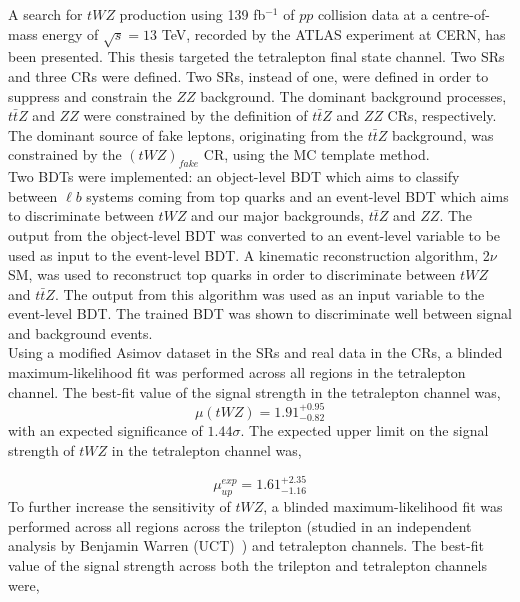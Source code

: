  


A search for $tWZ$ production using 139 fb$^{-1}$ of $pp$ collision data at a centre-of-mass energy of $\sqrt{s} = 13$ TeV, recorded by the ATLAS experiment at CERN, has been presented. This thesis targeted the tetralepton final state channel. Two SRs and three CRs were defined. Two SRs, instead of one, were defined in order to suppress and constrain the $ZZ$ background. The dominant background processes, $t\bar{t}Z $ and $ZZ$ were constrained by the definition of $t\bar{t}Z$ and $ZZ$ CRs, respectively. The dominant source of fake leptons, originating from the $t\bar{t}Z$ background, was constrained by the $(tWZ)_{fake}$ CR, using the MC template method.\\

Two BDTs were implemented: an object-level BDT which aims to classify between $\ell b$ systems coming from top quarks and an event-level BDT which aims to discriminate between $tWZ$ and our major backgrounds, $t\bar{t}Z$ and $ZZ$. The output from the object-level BDT was converted to an event-level variable to be used as input to the event-level BDT. A kinematic reconstruction algorithm, 2$\nu$SM, was used to reconstruct top quarks in order to discriminate between $tWZ$ and $t\bar{t}Z$. The output from this algorithm was used as an input variable to the event-level BDT. The trained BDT was shown to discriminate well between signal and background events.\\

Using a modified Asimov dataset in the SRs and real data in the CRs, a blinded maximum-likelihood fit was performed across all regions in the tetralepton channel. The best-fit value of the signal strength in the tetralepton channel was,
\begin{equation}
  \mu (tWZ) =   1.91^{+0.95}_{-0.82}
\end{equation}
with an expected significance of $1.44\sigma$. The expected upper limit on the signal strength of $tWZ$ in the tetralepton channel was,

\begin{equation}
  \mu_{up}^{exp} =   1.61^{+2.35}_{-1.16}
\end{equation}
To further increase the sensitivity of $tWZ$, a blinded maximum-likelihood fit was performed across all regions across the trilepton (studied in an independent analysis by Benjamin Warren (UCT)~\cite{ben-thesis}) and tetralepton channels. The best-fit value of the signal strength across both the trilepton and tetralepton channels were,

